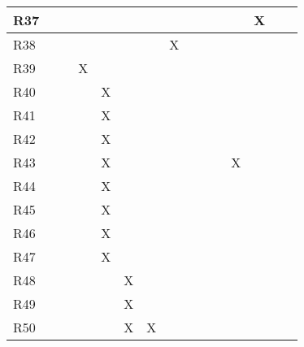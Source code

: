 \documentclass{article}
\begin{document}
\begin{tabular}{|l|l|l|l|l|l|l|l|l|l|l|l|l|l|l|}
R37 &&&&&&&&&&&&X \\\hline
R38 &&&&&&&X&&&&& \\\hline
R39 &&&X&&&&&&&&& \\\hline
R40 &&&&X&&&&&&&& \\\hline
R41 &&&&X&&&&&&&& \\\hline
R42 &&&&X&&&&&&&& \\\hline
R43 &&&&X&&&&&&&X& \\\hline
R44 &&&&X&&&&&&&& \\\hline
R45 &&&&X&&&&&&&& \\\hline
R46 &&&&X&&&&&&&& \\\hline
R47 &&&&X&&&&&&&& \\\hline
R48 &&&&&X&&&&&&& \\\hline
R49 &&&&&X&&&&&&& \\\hline
R50 &&&&&X&X&&&&&& \\\hline
\end{tabular}
\newpage
\end{document}
